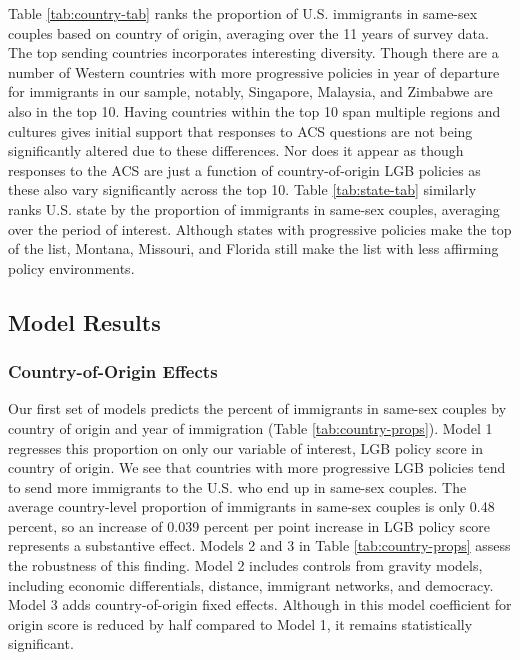 \documentclass[
  11pt,
]{article}
\begin{document}
Table \ref{tab:country-tab} ranks the proportion of U.S. immigrants in same-sex couples based on country of origin, averaging over the 11 years of survey data. The top sending countries incorporates interesting diversity. Though there are a number of Western countries with more progressive policies in year of departure for immigrants in our sample, notably, Singapore, Malaysia, and Zimbabwe are also in the top 10. Having countries within the top 10 span multiple regions and cultures gives initial support that responses to ACS questions are not being significantly altered due to these differences. Nor does it appear as though responses to the ACS are just a function of country-of-origin LGB policies as these also vary significantly across the top 10. Table \ref{tab:state-tab} similarly ranks U.S. state by the proportion of immigrants in same-sex couples, averaging over the period of interest. Although states with progressive policies make the top of the list, Montana, Missouri, and Florida still make the list with less affirming policy environments.

\hypertarget{model-results}{%
\subsection{Model Results}\label{model-results}}

\hypertarget{country-of-origin-effects}{%
\subsubsection{Country-of-Origin Effects}\label{country-of-origin-effects}}

Our first set of models predicts the percent of immigrants in same-sex couples by country of origin and year of immigration (Table \ref{tab:country-props}). Model 1 regresses this proportion on only our variable of interest, LGB policy score in country of origin. We see that countries with more progressive LGB policies tend to send more immigrants to the U.S. who end up in same-sex couples. The average country-level proportion of immigrants in same-sex couples is only 0.48 percent, so an increase of 0.039 percent per point increase in LGB policy score represents a substantive effect. Models 2 and 3 in Table \ref{tab:country-props} assess the robustness of this finding. Model 2 includes controls from gravity models, including economic differentials, distance, immigrant networks, and democracy. Model 3 adds country-of-origin fixed effects. Although in this model coefficient for origin score is reduced by half compared to Model 1, it remains statistically significant.
\end{document}
